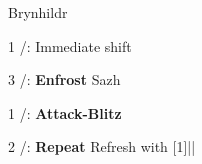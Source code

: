 \begin{mainlist}
	\item \skip
\end{mainlist}
\begin{fight}{Brynhildr}
	\item [1] \com/\rav: Immediate shift
	\item [3] \syn/\sab: \textbf{Enfrost} Sazh
	\item [1] \com/\rav: \textbf{Attack-Blitz}
	\item [2] \com/\med: \textbf{Repeat} \to Refresh with [1]||\save
\end{fight}
